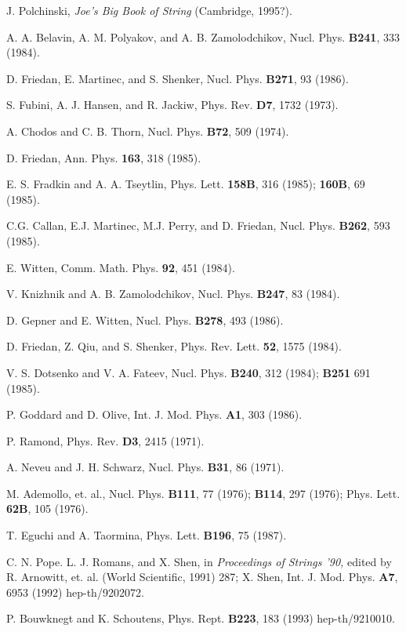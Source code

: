 \begin{thebibliography}{99}
 J. Polchinski, {\it Joe's Big Book of String}
(Cambridge, 1995?).

 A. A. Belavin, A. M. Polyakov, and A. B.
Zamolodchikov, Nucl. Phys. {\bf B241}, 333 (1984).

 D. Friedan, E. Martinec, and S. Shenker,
Nucl. Phys. {\bf B271}, 93 (1986).

 S. Fubini, A. J. Hansen, and R. Jackiw,
Phys. Rev. {\bf D7}, 1732 (1973).

 A. Chodos and C. B. Thorn, Nucl. Phys. {\bf
B72}, 509 (1974).
 
 D. Friedan, Ann. Phys. {\bf 163}, 318
(1985).

 E. S. Fradkin and A. A. Tseytlin, Phys. Lett.
{\bf 158B}, 316 (1985); {\bf 160B}, 69 (1985).

 C.G. Callan, E.J. Martinec, M.J. Perry, and
D. Friedan, Nucl. Phys. {\bf B262}, 593 (1985).

 E. Witten, Comm. Math. Phys. {\bf 92}, 451
(1984).

 V. Knizhnik and A. B. Zamolodchikov,
Nucl. Phys. {\bf B247}, 83 (1984).

 D. Gepner and E. Witten, Nucl. Phys. {\bf
B278}, 493 (1986).

 D. Friedan, Z. Qiu, and S. Shenker,
Phys. Rev. Lett. {\bf 52}, 1575 (1984).

 V. S. Dotsenko and V. A. Fateev,
Nucl. Phys. {\bf B240}, 312 (1984); {\bf B251} 691 (1985).

 P. Goddard and D. Olive, 
Int. J. Mod. Phys. {\bf A1}, 303 (1986).

 P. Ramond, Phys. Rev. {\bf D3}, 2415 (1971).

 A. Neveu and J. H. Schwarz, Nucl. Phys. {\bf B31}, 86
(1971).

 M. Ademollo, et. al., Nucl. Phys. {\bf
B111}, 77 (1976); {\bf B114}, 297 (1976); Phys. Lett. {\bf
62B}, 105 (1976).

 T. Eguchi and A. Taormina, Phys. Lett. {\bf
B196}, 75 (1987).

 C. N. Pope. L. J. Romans, and X. Shen,
in {\it Proceedings of Strings '90,} edited by R. Arnowitt,
et. al. (World Scientific, 1991) 287;
X. Shen, Int. J. Mod. Phys. {\bf A7}, 6953
(1992) hep-th/9202072.

 P. Bouwknegt and K. Schoutens, Phys. Rept.
{\bf B223}, 183 (1993) hep-th/9210010.


\end{thebibliography}
